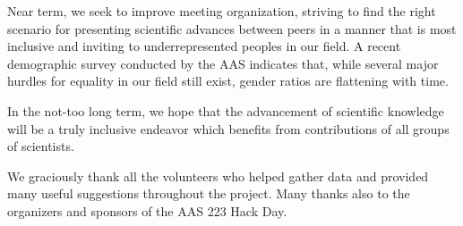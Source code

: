 \documentclass[iop]{emulateapj}
\begin{document}
Near term, we seek to improve meeting organization, striving to find the right scenario for presenting scientific advances between peers in a manner that is most inclusive and inviting to underrepresented peoples in our field. A recent demographic survey conducted by the AAS indicates that, while several major hurdles for equality in our field still exist, gender ratios are flattening with time.

In the not-too long term, we hope that the advancement of scientific knowledge will be a truly inclusive endeavor which benefits from contributions of all groups of scientists. 






\acknowledgements
We graciously thank all the volunteers who helped gather data and provided many useful suggestions throughout the project. Many thanks also to the organizers and sponsors of the AAS 223 Hack Day.
\end{document}
